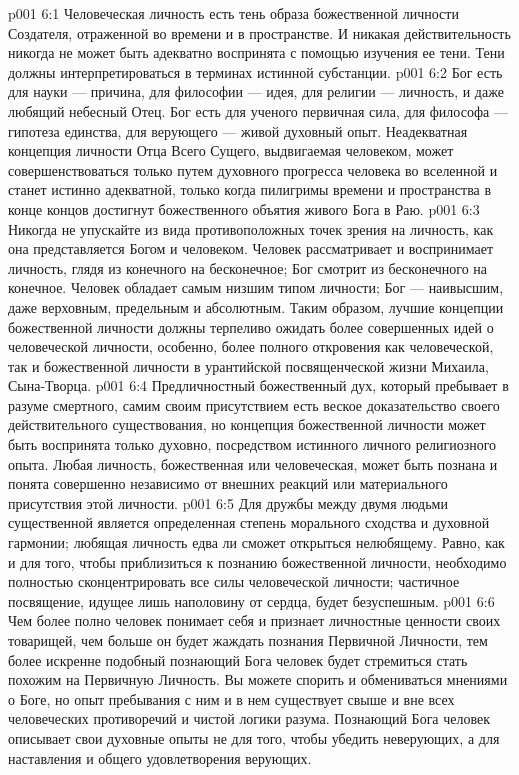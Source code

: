 \vs p001 6:1 Человеческая личность есть тень образа божественной личности Создателя, отраженной во времени и в пространстве. И никакая действительность никогда не может быть адекватно воспринята с помощью изучения ее тени. Тени должны интерпретироваться в терминах истинной субстанции.
\vs p001 6:2 \pc Бог есть для науки --- причина, для философии --- идея, для религии --- личность, и даже любящий небесный Отец. Бог есть для ученого первичная сила, для философа --- гипотеза единства, для верующего --- живой духовный опыт. Неадекватная концепция личности Отца Всего Сущего, выдвигаемая человеком, может совершенствоваться только путем духовного прогресса человека во вселенной и станет истинно адекватной, только когда пилигримы времени и пространства в конце концов достигнут божественного объятия живого Бога в Раю.
\vs p001 6:3 Никогда не упускайте из вида противоположных точек зрения на личность, как она представляется Богом и человеком. Человек рассматривает и воспринимает личность, глядя из конечного на бесконечное; Бог смотрит из бесконечного на конечное. Человек обладает самым низшим типом личности; Бог --- наивысшим, даже верховным, предельным и абсолютным. Таким образом, лучшие концепции божественной личности должны терпеливо ожидать более совершенных идей о человеческой личности, особенно, более полного откровения как человеческой, так и божественной личности в урантийской посвященческой жизни Михаила, Сына\hyp{}Творца.
\vs p001 6:4 \pc Предличностный божественный дух, который пребывает в разуме смертного, самим своим присутствием есть веское доказательство своего действительного существования, но концепция божественной личности может быть воспринята только духовно, посредством истинного личного религиозного опыта. Любая личность, божественная или человеческая, может быть познана и понята совершенно независимо от внешних реакций или материального присутствия этой личности.
\vs p001 6:5 Для дружбы между двумя людьми существенной является определенная степень морального сходства и духовной гармонии; любящая личность едва ли сможет открыться нелюбящему. Равно, как и для того, чтобы приблизиться к познанию божественной личности, необходимо полностью сконцентрировать все силы человеческой личности; частичное посвящение, идущее лишь наполовину от сердца, будет безуспешным.
\vs p001 6:6 Чем более полно человек понимает себя и признает личностные ценности своих товарищей, чем больше он будет жаждать познания Первичной Личности, тем более искренне подобный познающий Бога человек будет стремиться стать похожим на Первичную Личность. Вы можете спорить и обмениваться мнениями о Боге, но опыт пребывания с ним и в нем существует свыше и вне всех человеческих противоречий и чистой логики разума. Познающий Бога человек описывает свои духовные опыты не для того, чтобы убедить неверующих, а для наставления и общего удовлетворения верующих.
